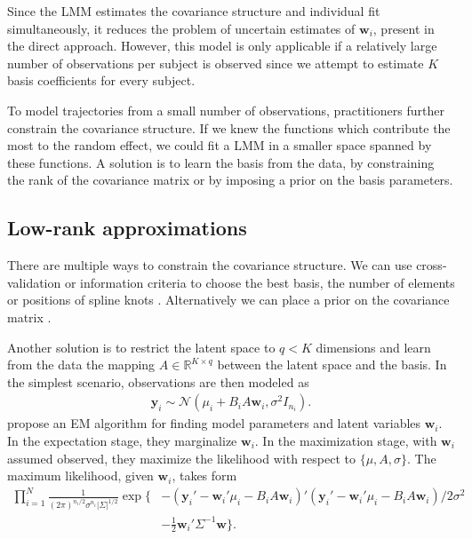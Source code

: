 \documentclass[preprint]{imsart}
\numberwithin{equation}{section}
\theoremstyle{plain}
\newcommand{\cN}{\mathcal{N}}
\newcommand{\R}{\mathbb{R}}
\newcommand{\by}{\mathbf{y}}
\newcommand{\bb}{\mathbf{b}}
\newcommand{\bw}{\mathbf{w}}
\begin{document}
Since the LMM estimates the covariance structure and individual fit simultaneously, it reduces the problem of uncertain estimates of $\bw_i$, present in the direct approach. However, this model is only applicable if a relatively large number of observations per subject is observed since we attempt to estimate $K$ basis coefficients for every subject.

To model trajectories from a small number of observations, practitioners further constrain the covariance structure. If we knew the functions which contribute the most to the random effect, we could fit a LMM in a smaller space spanned by these functions. A solution is to learn the basis from the data, by constraining the rank of the covariance matrix or by imposing a prior on the basis parameters.

\subsection{Low-rank approximations}\label{ss:reduced-rank}

There are multiple ways to constrain the covariance structure. We can use cross-validation or information criteria to choose the best basis, the number of elements or positions of spline knots \citep{rice2001nonparametric,bigelow2009bayesian}. Alternatively we can place a prior on the covariance matrix \citep{maclehose2009nonparametric}.

Another solution is to restrict the latent space to $q < K$ dimensions and learn from the data the mapping $A \in \R^{K \times q}$ between the latent space and the basis. In the simplest scenario, observations are then modeled as
\begin{align}\label{eq:james-model}
 \mathbf{y}_i \sim \cN(\mu_i + B_i A \mathbf{w}_i, \sigma^2I_{n_i}).
\end{align}
\citet{james2000principal} propose an EM algorithm for finding model parameters and latent variables $\bw_i$. In the expectation stage, they marginalize $\bw_i$. %
In the maximization stage, with $\bw_i$ assumed observed, they maximize the likelihood with respect to $\{\mu,A,\sigma\}$. The maximum likelihood, given $\bw_i$, takes form
\begin{align}
\prod_{i=1}^N \frac{1}{(2\pi)^{n_i/2} \sigma^{n_i} |\Sigma|^{1/2}} \exp\{ &-(\by_i' - \bw_i'\mu_i - B_i A \bw_i)'(\by_i' - \bw_i'\mu_i - B_i A \bw_i) / 2\sigma^2 \nonumber\\
&- \frac{1}{2}\bw_i' \Sigma^{-1} \bw \}.\label{eq:likelihood}
\end{align}
\end{document}
